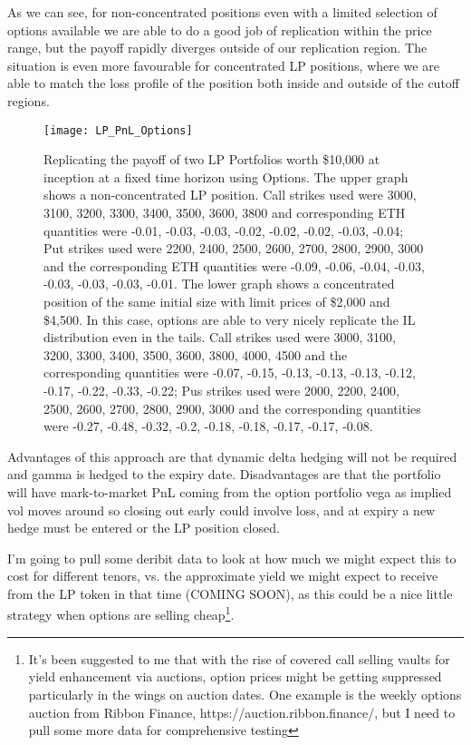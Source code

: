 \documentclass{article}
\begin{document}
\begin{enumerate}
As we can see, for non-concentrated positions even with a limited selection of options available we are able to do a good job of replication within the price range, but the payoff rapidly diverges outside of our replication region. The situation is even more favourable for concentrated LP positions, where we are able to match the loss profile of the position both inside and outside of the cutoff regions.

\begin{figure}
\centering
\texttt{[image: LP\_PnL\_Options]}
\caption{Replicating the payoff of two LP Portfolios worth \$10,000 at inception at a fixed time horizon using Options. The upper graph shows a non-concentrated LP position. Call strikes used were 3000, 3100, 3200, 3300, 3400, 3500, 3600, 3800 and corresponding ETH quantities were -0.01, -0.03, -0.03, -0.02, -0.02, -0.02, -0.03, -0.04; Put strikes used were 2200, 2400, 2500, 2600, 2700, 2800, 2900, 3000 and the corresponding ETH quantities were -0.09, -0.06, -0.04, -0.03, -0.03, -0.03, -0.03, -0.01. The lower graph shows a concentrated position of the same initial size with limit prices of \$2,000 and \$4,500. In this case, options are able to very nicely replicate the IL distribution even in the tails. Call strikes used were 3000, 3100, 3200, 3300, 3400, 3500, 3600, 3800, 4000, 4500 and the corresponding quantities were -0.07, -0.15, -0.13, -0.13, -0.13, -0.12, -0.17, -0.22, -0.33, -0.22; Pus strikes used were 2000, 2200, 2400, 2500, 2600, 2700, 2800, 2900, 3000 and the corresponding quantities were -0.27, -0.48, -0.32, -0.2, -0.18, -0.18, -0.17, -0.17, -0.08.}
\label{fig:lp_pnl_options}
\end{figure}

Advantages of this approach are that dynamic delta hedging will not be required and gamma is hedged to the expiry date. Disadvantages are that the portfolio will have mark-to-market PnL coming from the option portfolio vega as implied vol moves around so closing out early could involve loss, and at expiry a new hedge must be entered or the LP position closed.

I'm going to pull some deribit data to look at how much we might expect this to cost for different tenors, vs. the approximate yield we might expect to receive from the LP token in that time (COMING SOON), as this could be a nice little strategy when options are selling cheap\footnote{It's been suggested to me that with the rise of covered call selling vaults for yield enhancement via auctions, option prices might be getting suppressed particularly in the wings on auction dates. One example is the weekly options auction from Ribbon Finance, https://auction.ribbon.finance/, but I need to pull some more data for comprehensive testing}.



\end{enumerate}
\end{document}
